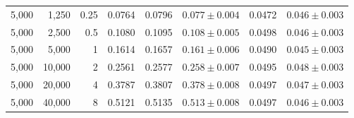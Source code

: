 \begin{table}[htbp]
{\begin{tabular}{rrrccccc}
5,000 & 1,250 & 0.25 & 0.0764 & 0.0796 & $0.077 \pm 0.004$ & 0.0472 & $0.046 \pm 0.003$ \\
5,000 & 2,500 & 0.5 & 0.1080 & 0.1095 & $0.108 \pm 0.005$ & 0.0498 & $0.046 \pm 0.003$ \\
5,000 & 5,000 & 1 & 0.1614 & 0.1657 & $0.161 \pm 0.006$ & 0.0490 & $0.045 \pm 0.003$ \\
5,000 & 10,000 & 2 & 0.2561 & 0.2577 & $0.258 \pm 0.007$ & 0.0495 & $0.048 \pm 0.003$ \\
5,000 & 20,000 & 4 & 0.3787 & 0.3807 & $0.378 \pm 0.008$ & 0.0497 & $0.047 \pm 0.003$ \\
5,000 & 40,000 & 8 & 0.5121 & 0.5135 & $0.513 \pm 0.008$ & 0.0497 & $0.046 \pm 0.003$ \\
\bottomrule
\end{tabular}}
\end{table}
